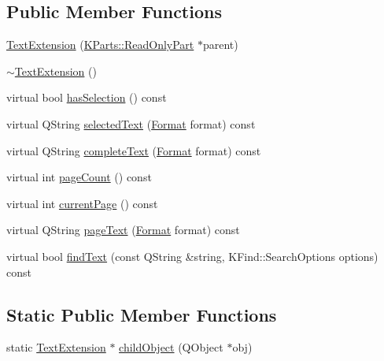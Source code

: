 \subsection*{\-Public \-Member \-Functions}
\begin{DoxyCompactItemize}
\item 
\hyperlink{classKParts_1_1TextExtension_a1c7077a3114c42f4b6cf78d4254fe5d0}{\-Text\-Extension} (\hyperlink{classKParts_1_1ReadOnlyPart}{\-K\-Parts\-::\-Read\-Only\-Part} $\ast$parent)
\item 
\hyperlink{classKParts_1_1TextExtension_a6d4e46c6cc819826182c3fc522a36b71}{$\sim$\-Text\-Extension} ()
\item 
virtual bool \hyperlink{classKParts_1_1TextExtension_a68623c6e7e7f57967c382550ccb3c00e}{has\-Selection} () const 
\item 
virtual \-Q\-String \hyperlink{classKParts_1_1TextExtension_a5ea4fb6f2237489affcde7c03e531574}{selected\-Text} (\hyperlink{classKParts_1_1TextExtension_a65ad08598c74eae19f0c7772a251685d}{\-Format} format) const 
\item 
virtual \-Q\-String \hyperlink{classKParts_1_1TextExtension_a42209cf90f31da5a3b01087518ad8625}{complete\-Text} (\hyperlink{classKParts_1_1TextExtension_a65ad08598c74eae19f0c7772a251685d}{\-Format} format) const 
\item 
virtual int \hyperlink{classKParts_1_1TextExtension_a62e0cd5df36c13591ed526bf58487d96}{page\-Count} () const 
\item 
virtual int \hyperlink{classKParts_1_1TextExtension_a3351795dd9a2257127ce978aaff68448}{current\-Page} () const 
\item 
virtual \-Q\-String \hyperlink{classKParts_1_1TextExtension_ab0a417697ec8edb599ba35f38bf90261}{page\-Text} (\hyperlink{classKParts_1_1TextExtension_a65ad08598c74eae19f0c7772a251685d}{\-Format} format) const 
\item 
virtual bool \hyperlink{classKParts_1_1TextExtension_aaaf29f56cbe212b3eea11d3811bfd270}{find\-Text} (const \-Q\-String \&string, \-K\-Find\-::\-Search\-Options options) const 
\end{DoxyCompactItemize}
\subsection*{\-Static \-Public \-Member \-Functions}
\begin{DoxyCompactItemize}
\item 
static \hyperlink{classKParts_1_1TextExtension}{\-Text\-Extension} $\ast$ \hyperlink{classKParts_1_1TextExtension_ae6a6df769ff322ad46396e83f26e8dec}{child\-Object} (\-Q\-Object $\ast$obj)
\end{DoxyCompactItemize}


